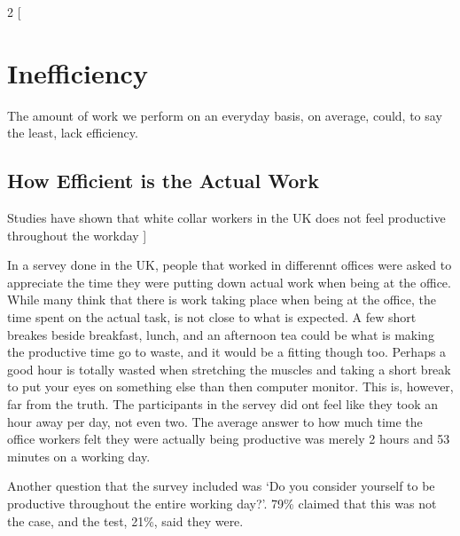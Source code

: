\documentclass[12pt, a4paper]{article}
\begin{document}
    \begin{multicols}{2}
        [ 
        \section{Inefficiency}
        The amount of work we perform on an everyday basis, on average, could, to say the least, lack efficiency.
        \newpage
        \subsection{How Efficient is the Actual Work}
Studies have shown that white collar workers in the UK does not feel productive throughout the workday 
        ]

        In a servey done in the UK, people that worked in differennt offices were asked to appreciate the time they were putting down actual work when being at the office. While many think that there is work taking place when being at the office, the time spent on the actual task, is not close to what is expected.\cite{Ltd2021Nov}
        A few short breakes beside breakfast, lunch, and an afternoon tea could be what is making the productive time go to waste, and it would be a fitting though too. Perhaps a good hour is totally wasted when stretching the muscles and taking a short break to put your eyes on something else than then computer monitor.
        This is, however, far from the truth. The participants in the servey did ont feel like they took an hour away per day, not even two. The average answer to how much time the office workers felt they were actually being productive was merely 2 hours and 53 minutes on a working day.

        Another question that the survey included was `Do you consider yourself to be productive throughout the entire working day?'. 79\% claimed that this was not the case, and the test, 21\%, said they were.\cite{Ltd2021Nov}

    \end{multicols}
\end{document}
